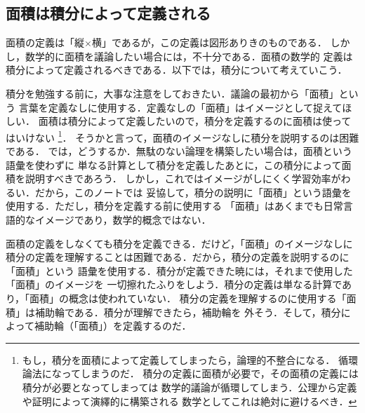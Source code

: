 ﻿%
            \subsection{面積は積分によって定義される}
                面積の定義は「縦$\times$横」であるが，この定義は図形ありきのものである．
                しかし，数学的に面積を議論したい場合には，不十分である．面積の数学的
                定義は積分によって定義されるべきである．以下では，積分について考えていこう．
                
                積分を勉強する前に，大事な注意をしておきたい．議論の最初から「面積」という
                言葉を定義なしに使用する．定義なしの「面積」はイメージとして捉えてほしい．
                面積は積分によって定義したいので，積分を定義するのに面積は使ってはいけない
                    \footnote{
                       もし，積分を面積によって定義してしまったら，論理的不整合になる．
                       循環論法になってしまうのだ．
                       積分の定義に面積が必要で，その面積の定義には積分が必要となってしまっては
                       数学的議論が循環してしまう．公理から定義や証明によって演繹的に構築される
                       数学としてこれは絶対に避けるべき．
                    }． 
                そうかと言って，面積のイメージなしに積分を説明するのは困難である．
                では，どうするか．無駄のない論理を構築したい場合は，面積という語彙を使わずに
                単なる計算として積分を定義したあとに，この積分によって面積を説明すべきであろう．
                しかし，これではイメージがしにくく学習効率がわるい．だから，このノートでは
                妥協して，積分の説明に「面積」という語彙を使用する．ただし，積分を定義する前に使用する
                「面積」はあくまでも日常言語的なイメージであり，数学的概念ではない．

                面積の定義をしなくても積分を定義できる．だけど，「面積」のイメージなしに
                積分の定義を理解することは困難である．だから，積分の定義を説明するのに「面積」という
                語彙を使用する．積分が定義できた暁には，それまで使用した「面積」のイメージを
                一切擦れたふりをしよう．積分の定義は単なる計算であり，「面積」の概念は使われていない．
                積分の定義を理解するのに使用する「面積」は補助輪である．積分が理解できたら，補助輪を
                外そう．そして，積分によって補助輪（「面積」）を定義するのだ．


